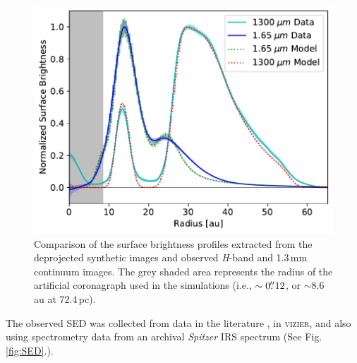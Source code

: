 \documentclass[letters,usenatbib,times]{mnras}
\begin{document}
\begin{figure}
	\includegraphics[width=\columnwidth]{comp_fig_all_profiles_au.pdf}
    \caption{Comparison of the surface brightness profiles extracted from the deprojected synthetic images and observed \textit{H}-band and 1.3\,mm continuum images. The grey shaded area represents the radius of the artificial coronagraph used in the simulations (i.e., $\sim0\hbox{$.\!\!^{\prime\prime}$} 12$, or $\sim$8.6\,au at 72.4\,pc).}
    \label{fig:radprofiles}
\end{figure}

The observed SED was collected from data in the literature \citep{1988iras....7.....H, 1990A&A...234..230H, Jensen_97, 2000A&A...355L..27H, 2001KFNT...17..409K, 2003yCat.2246....0C, 2007PASJ...59S.369M, 2008PASP..120.1128O, 2010A&A...514A...1I, 2012yCat.2311....0C}, in \textsc{vizier}, and also using spectrometry data from an archival \textit{Spitzer} IRS spectrum (See Fig.\ref{fig:SED}.).
\end{document}
